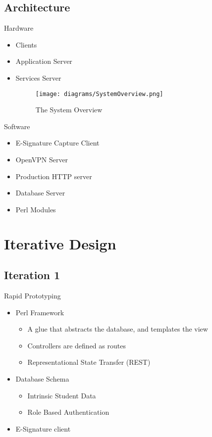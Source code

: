 \documentclass{beamer}
\begin{document}
\subsection{Architecture}
\begin{frame}{Hardware}
\begin{itemize}
\item Clients
\item Application Server
\item Services Server
\begin{figure}[!h]
\texttt{[image: diagrams/SystemOverview.png]} \caption{ The System Overview } \label{fig:Users}
\end{figure}

\end{itemize}
\end{frame}
\begin{frame}{Software}
\begin{itemize}
\item E-Signature Capture Client
\item OpenVPN Server
\item Production HTTP server
\item Database Server
\item Perl Modules 
\end{itemize}
\end{frame}
\section{Iterative Design}

\subsection{Iteration 1}
\begin{frame}{Rapid Prototyping}
\begin{itemize}
\item Perl Framework
\begin{itemize}
\item A glue that abstracts the database, and templates the view
\item Controllers are defined as routes
\item Representational State Transfer (REST)
\end{itemize}
\item Database Schema
\begin{itemize}
\item Intrinsic Student Data
\item Role Based Authentication
\end{itemize}
\item E-Signature client
\end{itemize}
\end{frame}
\end{document}
